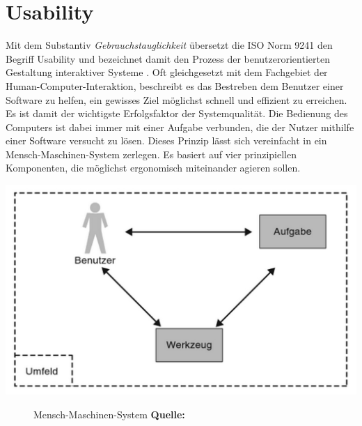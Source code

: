 %
%
%
%

\chapter{Usability}

Mit dem Substantiv \textit{Gebrauchstauglichkeit} übersetzt die ISO Norm 9241 den Begriff Usability und bezeichnet damit den Prozess der \glqq benutzerorientierten Gestaltung interaktiver Systeme\grqq{} \cite{iso9241}. Oft gleichgesetzt mit dem Fachgebiet der Human-Computer-Interaktion, beschreibt es das Bestreben dem Benutzer einer Software zu helfen, ein gewisses Ziel möglichst schnell und effizient zu erreichen. Es ist damit der wichtigste Erfolgsfaktor der Systemqualität. Die Bedienung des Computers ist dabei immer mit einer Aufgabe verbunden, die der Nutzer mithilfe einer Software versucht zu lösen. Dieses Prinzip lässt sich vereinfacht in ein Mensch-Maschinen-System zerlegen. Es basiert auf vier prinzipiellen Komponenten, die möglichst ergonomisch miteinander agieren sollen.

\vspace{0.6cm}
\includegraphics[scale=0.5]{./images/human-machine-system}
\begin{figure}[htb]
   \centering
   \caption{Mensch-Maschinen-System \textbf{Quelle:} \cite{UsabilityKompakt}}
    \label{mms}
\end{figure}

